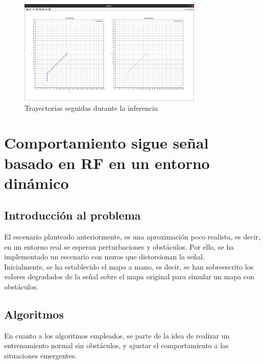 \begin{figure} [t]
    \begin{center}
    \includegraphics[height=5cm]{imagenes/cap4/13_trayectorias_12.png}
    \end{center}
    \caption[Trayectorias seguidas durante la inferencia]{Trayectorias seguidas durante la inferencia}
    \label{fig:12_traj}
\end{figure}

\section{Comportamiento sigue señal basado en \ac{RF} en un entorno dinámico}
\label{sec:signal_follow_obs}

\subsection{Introducción al problema}
\label{subsec:intro_sfo}

El escenario planteado anteriormente, es una aproximación poco realista, es decir, en un entorno real se esperan perturbaciones y obstáculos. Por ello, se ha implementado un escenario con muros que distorsionan la señal.\\

Inicialmente, se ha establecido el mapa a mano, es decir, se han sobreescrito los valores degradados de la señal sobre el mapa original para simular un mapa con obstáculos.\\

\subsection{Algoritmos}
\label{subsec:algoritmo_sfo}

En cuanto a los algoritmos empleados, se parte de la idea de realizar un entrenamiento normal sin obstáculos, y ajustar el comportamiento a las situaciones emergentes.\\


